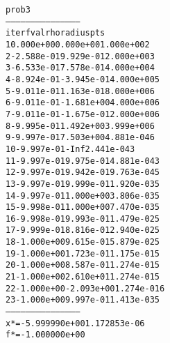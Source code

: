 \begin{alltt}
prob3
---------------------------------------------
iter        fval         rho      radius  pts
   1   0.000e+00   0.000e+00   1.000e+00    2
   2  -2.588e-01   9.929e-01   2.000e+00    3
   3  -6.533e-01   7.578e-01   4.000e+00    4
   4  -8.924e-01  -3.945e-01   4.000e+00    5
   5  -9.011e-01   1.163e-01   8.000e+00    6
   6  -9.011e-01  -1.681e+00   4.000e+00    6
   7  -9.011e-01  -1.675e-01   2.000e+00    6
   8  -9.995e-01   1.492e+00   3.999e+00    6
   9  -9.997e-01   7.503e+00   4.881e-04    6
  10  -9.997e-01        -Inf   2.441e-04    3
  11  -9.997e-01   9.975e-01   4.881e-04    3
  12  -9.997e-01   9.942e-01   9.763e-04    5
  13  -9.997e-01   9.999e-01   1.920e-03    5
  14  -9.997e-01   1.000e+00   3.806e-03    5
  15  -9.998e-01   1.000e+00   7.470e-03    5
  16  -9.998e-01   9.993e-01   1.479e-02    5
  17  -9.999e-01   8.816e-01   2.940e-02    5
  18  -1.000e+00   9.615e-01   5.879e-02    5
  19  -1.000e+00   1.723e-01   1.175e-01    5
  20  -1.000e+00   8.587e-01   1.274e-01    5
  21  -1.000e+00   2.610e+01   1.274e-01    5
  22  -1.000e+00  -2.093e+00   1.274e-01    6
  23  -1.000e+00   9.997e-01   1.413e-03    5
---------------------------------------------
x* = -5.999990e+00  1.172853e-06  
f* = -1.000000e+00
\end{alltt}
